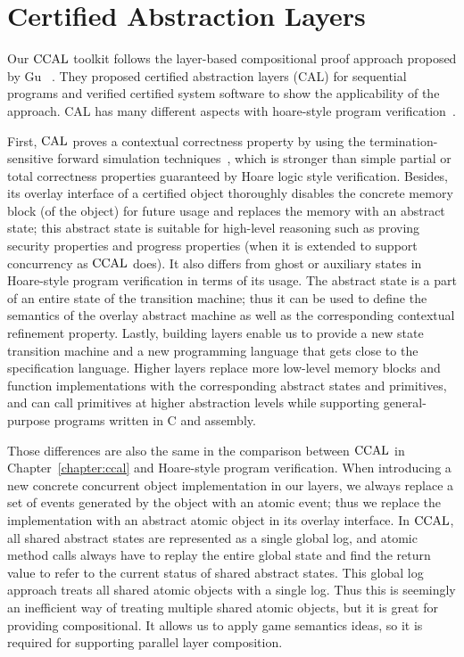 
\section{Certified Abstraction Layers}
\label{chatper:related:sec:certified-abstraction-laayers}

Our $\mathrm{CCAL}$ toolkit follows the layer-based compositional proof approach proposed by Gu \etal~\cite{deepspec}.
They proposed certified abstraction layers (CAL) for sequential programs and 
verified certified system software to show the applicability of the approach.
CAL has many different aspects with
 hoare-style program verification~\cite{hoare69,reynolds02,boogie05,nanevski06}.

First, $\mathrm{CAL}$ proves a contextual correctness property by using the termination-sensitive forward simulation 
techniques~\cite{Lynch95,compcert}, 
which is stronger than simple partial or total correctness properties guaranteed by Hoare logic style verification.
Besides, its overlay interface of a certified object thoroughly disables 
the concrete memory block (of the object)  for  future usage 
and replaces the memory with an abstract state;
this abstract state is suitable for high-level reasoning such as proving security properties and progress properties (when it is extended to support
concurrency as $\mathrm{CCAL}$ does). 
It also differs from ghost or auxiliary states in Hoare-style program verification in terms of 
its usage.
The abstract state is a part of an entire state of the transition machine; 
thus it can be used to define the semantics of the overlay abstract machine
as well as the corresponding contextual refinement property.
Lastly,  building layers enable us to provide a new state transition machine and a new programming language that gets close to the specification language. 
Higher layers replace more low-level memory blocks and function implementations with 
the corresponding abstract states and primitives,
and can call primitives at higher abstraction levels while  
supporting general-purpose
programs written in C and assembly.

Those differences are also the same in the comparison between $\mathrm{CCAL}$ in Chapter~\ref{chapter:ccal} and 
Hoare-style program verification. 
When introducing a new concrete concurrent object implementation in our layers, 
we always replace a set of events generated by the object with an atomic event; thus we replace the implementation with an abstract atomic object in its overlay interface. 
In $\mathrm{CCAL}$,
all shared abstract states are represented as a single global log,
and atomic method calls always have to 
replay the entire global state and find the return value to refer to the current status of shared abstract states.
This global log approach treats all shared atomic objects with a single log.
Thus this  is seemingly an inefficient way of treating multiple shared atomic objects,
but it is great for providing compositional. 
It allows us to apply game semantics ideas, so it
is required for supporting parallel layer composition.




